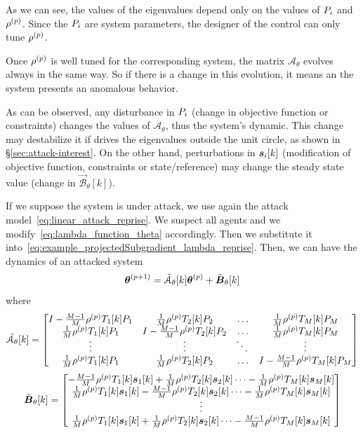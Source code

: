 \documentclass[../main.tex]{subfiles}
\begin{document}
As we can see, the values of the eigenvalues depend only on the values of ${P}_{i}$ and $\rho^{(p)}$.
Since the ${P}_{i}$ are system parameters, the designer of the control can only tune $\rho^{(p)}$.

Once $\rho^{(p)}$ is well tuned for the corresponding system, the matrix $\mathcal{A}_{\theta}$ evolves always in the same way.
So if there is a change in this evolution, it means an the system presents an anomalous behavior.

As can be observed, any disturbance in ${P}_{i}$ (change in objective function or constraints) changes the values of $\mathcal{A}_{\theta}$, thus the system's dynamic. This change may destabilize it if drives the eigenvalues outside the unit circle, as shown in \S\ref{sec:attack-interest}.
On the other hand, perturbations in $\boldsymbol{s}_{i}[k]$ (modification of objective function, constraints or state/reference) may change the steady state value (change in $\mathcal{\vec{B}}_{\theta}[k]$).

If we suppose the system is under attack, we use again the attack model~\eqref{eq:linear_attack_reprise}.
We suspect all agents and we modify~\eqref{eq:lambda_function_theta} accordingly. Then we substitute it into~\eqref{eq:example_projectedSubgradient_lambda_reprise}.
Then, we can have the dynamics of an attacked system
\begin{equation}
  \label{eq:negotiation_equation_substituting_organizing_tilde}
  \boldsymbol{\theta}^{(p+1)}=\tilde{\mathcal{A}}_{\theta}[k]\boldsymbol{\theta}^{(p)}+\tilde{\mathcal{\boldsymbol{B}}}_{\theta}[k]
\end{equation}
where
\begin{equation}
\tilde{\mathcal{A}_{\theta}}[k]=\left[
\begin{matrix}
I-\frac{M-1}{M}\rho\p \Tik[1]\Plin[1] & \frac{1}{M}\rho\p \Tik[2]\Plin[2]&\dots&\frac{1}{M}\rho\p \Tik[M]\Plin[M]\\
\frac{1}{M}\rho\p \Tik[1]\Plin[1]&I-\frac{M-1}{M}\rho\p \Tik[2]\Plin[2]&\dots&\frac{1}{M}\rho\p \Tik[M]\Plin[M]\\
\vdots&\vdots&\ddots&\vdots\\
\frac{1}{M}\rho\p \Tik[1]\Plin[1]&\frac{1}{M}\rho\p \Tik[2]\Plin[2]&\dots&I-\frac{M-1}{M}\rho\p \Tik[M]\Plin[M]\\
\end{matrix}
\right]
\end{equation}
\begin{equation}
\tilde{\mathcal{\vec{B}}}_{\theta}[k]=\left[
\begin{matrix}
-\frac{M-1}{M}\rho\p \Tik[1]\vec{s}_{1}[k]+\frac{1}{M}\rho\p \Tik[2]\vec{s}_{2}[k]\dots-\frac{1}{M}\rho\p \Tik[M]\vec{s}_{M}[k]\\
\frac{1}{M}\rho\p \Tik[1]\vec{s}_{1}[k]-\frac{M-1}{M}\rho\p \Tik[2]\vec{s}_{2}[k] \dots-\frac{1}{M}\rho\p \Tik[M]\vec{s}_{M}[k]\\
\vdots\\
\frac{1}{M}\rho\p \Tik[1]\vec{s}_{1}[k]+\frac{1}{M}\rho\p \Tik[2]\vec{s}_{2}[k]\dots-\frac{M-1}{M}\rho\p \Tik[M]\vec{s}_{M}[k]\\
\end{matrix}
\right]
\end{equation}
\end{document}
